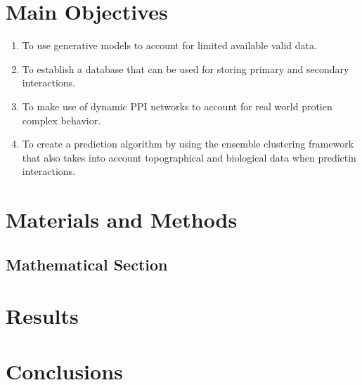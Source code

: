 \documentclass[a0, landscape]{a0poster}
\begin{document}
\begin{multicols}{4}
\section*{Main Objectives}

\begin{enumerate}
\item To use generative models to account for limited available valid data.
\item To establish a database that can be used for storing primary and secondary interactions.
\item To make use of dynamic PPI networks to account for real world protien complex behavior.
\item To create a prediction algorithm by using the ensemble clustering framework that also takes into account topographical and biological data when predictin interactions.
\end{enumerate}


\section*{Materials and Methods}


\subsection*{Mathematical Section}


\section*{Results}

\color{SaddleBrown} %

\section*{Conclusions}


\end{multicols}
\end{document}
